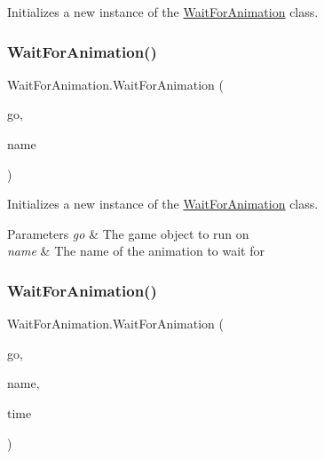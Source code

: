 Initializes a new instance of the \hyperlink{class_wait_for_animation}{Wait\+For\+Animation} class. 

\mbox{\label{class_wait_for_animation_a8a85909f01899724a26cd5451051039e}} 
\subsubsection{\texorpdfstring{Wait\+For\+Animation()}{WaitForAnimation()}\hspace{0.1cm}{\footnotesize\ttfamily [2/4]}}
{\footnotesize\ttfamily Wait\+For\+Animation.\+Wait\+For\+Animation (\begin{DoxyParamCaption}\item[{Game\+Object}]{go,  }\item[{string}]{name }\end{DoxyParamCaption})\hspace{0.3cm}{\ttfamily [inline]}}



Initializes a new instance of the \hyperlink{class_wait_for_animation}{Wait\+For\+Animation} class. 


\begin{DoxyParams}{Parameters}
{\em go} & The game object to run on \\
\hline
{\em name} & The name of the animation to wait for \\
\hline
\end{DoxyParams}
\mbox{\label{class_wait_for_animation_a29e836a6688ce19b2a540619afeffca6}} 
\subsubsection{\texorpdfstring{Wait\+For\+Animation()}{WaitForAnimation()}\hspace{0.1cm}{\footnotesize\ttfamily [3/4]}}
{\footnotesize\ttfamily Wait\+For\+Animation.\+Wait\+For\+Animation (\begin{DoxyParamCaption}\item[{Game\+Object}]{go,  }\item[{string}]{name,  }\item[{float}]{time }\end{DoxyParamCaption})\hspace{0.3cm}{\ttfamily [inline]}}



